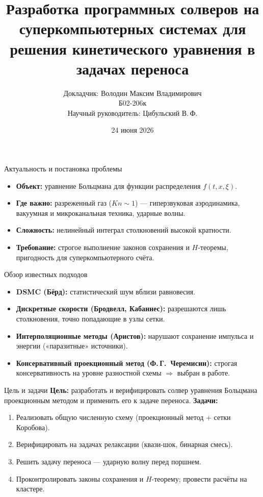 \documentclass[aspectratio=169]{beamer}
\title[Солверы кинетического уравнения]{Разработка программных солверов на суперкомпьютерных
системах для решения кинетического уравнения в задачах переноса}
\author[Володин М.\,В.]{Докладчик: Володин Максим Владимирович \\ Б02-206к \\
Научный руководитель: Цибульский В.\,Ф.}
\institute[МФТИ]{МФТИ, Физтех-школа физики и исследований имени Ландау \\
Кафедра моделирования ядерных процессов и технологий}
\date{24 июня 2026}
\begin{document}
\begin{frame}
  \titlepage
\end{frame}

\begin{frame}{Актуальность и постановка проблемы}
  \begin{itemize}
    \item \textbf{Объект:} уравнение Больцмана для функции распределения $f(t,x,\xi)$.
    \item \textbf{Где важно:} разреженный газ ($Kn\sim1$) — гиперзвуковая аэродинамика,
          вакуумная и микроканальная техника, ударные волны.
    \item \textbf{Сложность:} нелинейный интеграл столкновений высокой кратности.
    \item \textbf{Требование:} строгое выполнение законов сохранения и $H$-теоремы,
          пригодность для суперкомпьютерного счёта.
  \end{itemize}
\end{frame}

\begin{frame}{Обзор известных подходов}
  \begin{itemize}
    \item \textbf{DSMC (Бёрд):} статистический шум вблизи равновесия.
    \item \textbf{Дискретные скорости (Бродвелл, Кабаннес):} разрешаются лишь столкновения,
          точно попадающие в узлы сетки.
    \item \textbf{Интерполяционные методы (Аристов):} нарушают сохранение импульса и энергии
          («паразитные» источники).
    \item \textbf{Консервативный проекционный метод (Ф.\,Г.~Черемисин):} строгая
          консервативность на уровне разностной схемы $\Rightarrow$ выбран в работе.
  \end{itemize}
\end{frame}

\begin{frame}{Цель и задачи}
  \textbf{Цель:} разработать и верифицировать солвер уравнения Больцмана проекционным
  методом и применить его к задаче переноса.
  \vfill
  \textbf{Задачи:}
  \begin{enumerate}
    \item Реализовать общую численную схему (проекционный метод + сетки Коробова).
    \item Верифицировать на задачах релаксации (квази-шок, бинарная смесь).
    \item Решить задачу переноса — ударную волну перед поршнем.
    \item Проконтролировать законы сохранения и $H$-теорему; провести расчёты на кластере.
  \end{enumerate}
\end{frame}
\end{document}
